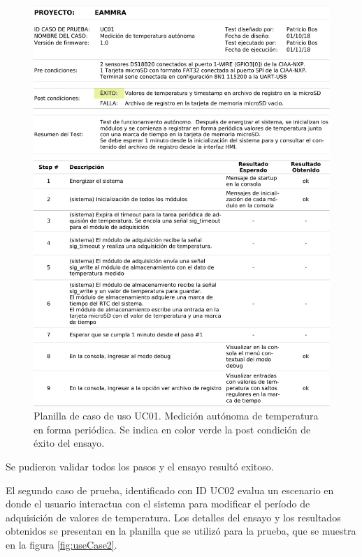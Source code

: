 \begin{figure}[!htb]
	\centering
	\includegraphics[width=1\textwidth]{./Figures/UseCase1.pdf}
	\caption{Planilla de caso de uso UC01. Medición autónoma de temperatura en forma periódica. Se indica en color verde la post condición de éxito del ensayo.}
	\label{fig:useCase1}
\end{figure}

Se pudieron validar todos los pasos y el ensayo resultó exitoso.

El segundo caso de prueba, identificado con ID UC02 evalua un escenario en donde el usuario interactua con el sistema para modificar el período de adquisición de valores de temperatura.  Los detalles del ensayo y los resultados obtenidos se presentan en la planilla que se utilizó para la prueba, que se muestra en la figura \ref{fig:useCase2}. 

\vspace{10px}

